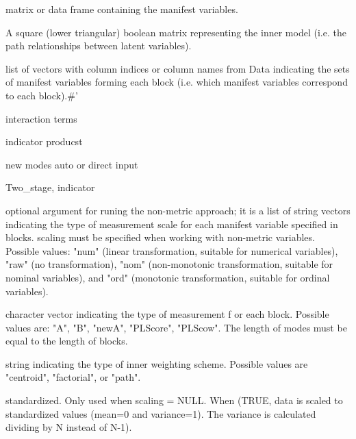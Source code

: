\documentclass[a4paper]{book}
\begin{document}
\begin{Arguments}
\begin{ldescription}
\item[\code{Data}] matrix or data frame containing the manifest variables.

\item[\code{path\_matrix}] A square (lower triangular) boolean matrix
representing the inner model (i.e. the path relationships between latent variables).

\item[\code{blocks}] list of vectors with column indices
or column names from Data indicating the sets of
manifest variables forming each block (i.e.
which manifest variables correspond to each block).\#'

\item[\code{interactionTerm}] interaction terms

\item[\code{indicator\_prod}] indicator producst

\item[\code{inter\_modes}] new modes auto or direct input

\item[\code{method}] Two\_stage, indicator

\item[\code{modes}] optional argument for runing the non-metric approach;
it is a list of string vectors indicating the type of measurement
scale for each manifest variable specified in blocks. scaling must be
specified when working with non-metric variables. Possible values:
"num" (linear transformation, suitable for numerical variables),
"raw" (no transformation), "nom" (non-monotonic transformation,
suitable for nominal variables), and "ord" (monotonic transformation,
suitable for ordinal variables).

\item[\code{scaling}] character vector indicating the type of measurement f
or each block. Possible values are: "A", "B", "newA", "PLScore",
"PLScow". The length of modes must be equal to the length of blocks.

\item[\code{scheme}] string indicating the type of inner weighting scheme.
Possible values are "centroid", "factorial", or "path".

\item[\code{scaled}] standardized. Only used when scaling = NULL.
When (TRUE, data is scaled to standardized values (mean=0 and variance=1).
The variance is calculated dividing by N instead of N-1).


\end{ldescription}
\end{Arguments}
\end{document}
